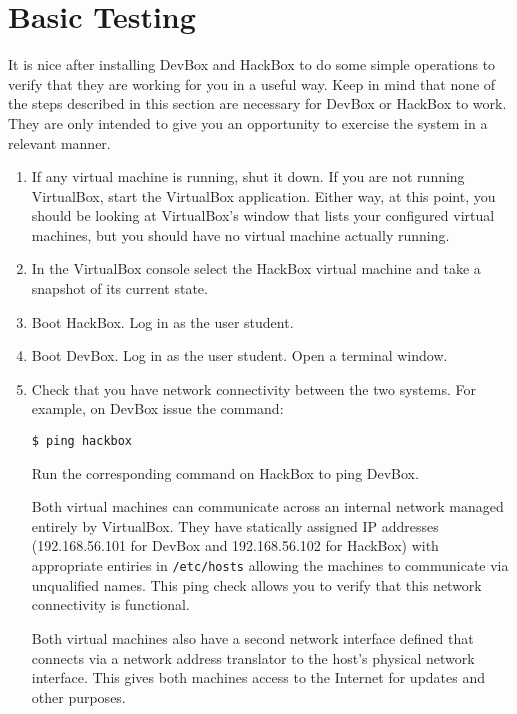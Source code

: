\documentclass[twocolumn]{article}
\begin{document}
\section{Basic Testing}

It is nice after installing DevBox and HackBox to do some simple operations to verify that they
are working for you in a useful way. Keep in mind that none of the steps described in this
section are necessary for DevBox or HackBox to work. They are only intended to give you an
opportunity to exercise the system in a relevant manner.

\begin{enumerate}

\item If any virtual machine is running, shut it down. If you are not running VirtualBox, start
  the VirtualBox application. Either way, at this point, you should be looking at VirtualBox's
  window that lists your configured virtual machines, but you should have no virtual machine
  actually running.

\item In the VirtualBox console select the HackBox virtual machine and take a snapshot of its
  current state.

\item Boot HackBox. Log in as the user student.

\item Boot DevBox. Log in as the user student. Open a terminal window.

\item Check that you have network connectivity between the two systems. For example, on DevBox
  issue the command:
\begin{Verbatim}
$ ping hackbox
\end{Verbatim}
  Run the corresponding command on HackBox to ping DevBox.

  Both virtual machines can communicate across an internal network managed entirely by
  VirtualBox. They have statically assigned IP addresses (192.168.56.101 for DevBox and
  192.168.56.102 for HackBox) with appropriate entiries in \texttt{/etc/hosts} allowing the
  machines to communicate via unqualified names. This ping check allows you to verify that this
  network connectivity is functional.

  Both virtual machines also have a second network interface defined that connects via a network
  address translator to the host's physical network interface. This gives both machines access
  to the Internet for updates and other purposes.


\end{enumerate}
\end{document}
